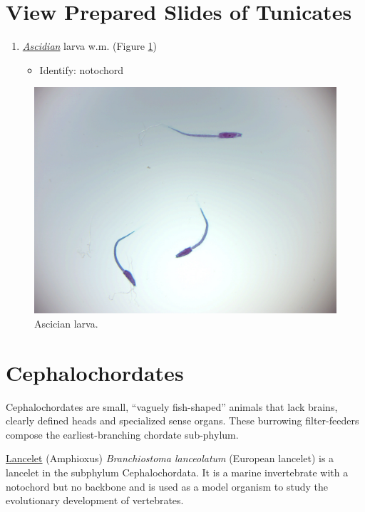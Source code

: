 \section{View Prepared Slides of
Tunicates}\label{view-prepared-slides-of-tunicates}

\begin{enumerate}
\def\labelenumi{\arabic{enumi}.}
\tightlist
\item
  \href{https://en.wikipedia.org/wiki/Ascidiacea}{\emph{Ascidian}} larva
  w.m. (Figure \ref{fig:ascidian})

  \begin{itemize}
  \tightlist
  \item
    Identify: notochord
  \end{itemize}
\end{enumerate}

\begin{figure}

{\centering \includegraphics[width=0.7\linewidth]{./figures/echinodermata/ascidian_larva}

}

\caption{Ascician larva.}\label{fig:ascidian}
\end{figure}

\section{Cephalochordates}\label{cephalochordates}

Cephalochordates are small, ``vaguely fish-shaped'' animals that lack
brains, clearly defined heads and specialized sense organs. These
burrowing filter-feeders compose the earliest-branching chordate
sub-phylum.

\href{https://en.wikipedia.org/wiki/Lancelet}{Lancelet} (Amphioxus)
\emph{Branchiostoma lanceolatum} (European lancelet) is a lancelet in
the subphylum Cephalochordata. It is a marine invertebrate with a
notochord but no backbone and is used as a model organism to study the
evolutionary development of vertebrates.

